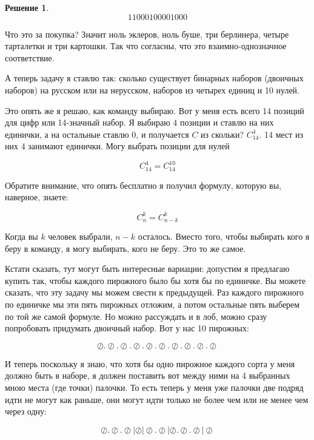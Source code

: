 \documentclass[russian]{lecture-notes}
\theoremstyle{definition}
\newtheorem*{solution}{Решение}
\begin{document}
\begin{enumerate}
\begin{solution}
			\[
				1 1 0 0 0 1 0 0 0 0 1 0 0 0
			\]
			
			Что это за покупка? Значит ноль эклеров, ноль буше, три берлинера, четыре тарталетки и три картошки. Так что согласны, что это взаимно-однозначное соответствие.
			
			
			А теперь задачу я ставлю так: сколько существует бинарных наборов (двоичных наборов) на русском или на нерусском, наборов из четырех единиц и 10 нулей.
			
			Это опять же я решаю, как команду выбираю. Вот у меня есть всего 14 позиций для цифр или 14-значный набор. Я выбираю 4 позиции и ставлю на них единички, а на остальные ставлю 0, и получается $C$ из скольки? $C_{14}^4$. 14 мест из них 4 занимают единички. Могу выбрать позиции для нулей
			
			\[
				C_{14}^4 = C_{14}^{10}
			\]
			
		\end{solution}
	
		Обратите внимание, что опять бесплатно я получил формулу, которую вы, наверное, знаете:
		
		\[
		C_n^k = C_{n-k}^k
		\]
		
		Когда вы $k$ человек выбрали, $n - k$ осталось. Вместо того, чтобы выбирать кого я беру в команду, я могу выбирать, кого не беру. Это то же самое.
		
		Кстати сказать, тут могут быть интересные вариации: допустим я предлагаю купить так, чтобы каждого пирожного было бы хотя бы по единичке. Вы можете сказать, что эту задачу мы можем свести к предыдущей. Раз каждого пирожного по единичке мы эти пять пирожных отложим, а потом остальные пять выберем по той же самой формуле. Но можно рассуждать и в лоб, можно сразу попробовать придумать двоичный набор. Вот у нас 10 пирожных:
		
		\[
			\oslash . \oslash . \oslash . \oslash . \oslash . \oslash . \oslash . \oslash . \oslash . \oslash
		\]
		
		И теперь поскольку я знаю, что хотя бы одно пирожное каждого сорта у меня должно быть в наборе, я должен поставить вот между ними на 4 выбранных мною места (где точки) палочки. То есть теперь у меня уже палочки две подряд идти не могут как раньше, они могут идти только не более чем или не менее чем через одну:
		
		\[
			\oslash . \oslash . \oslash | \oslash | \oslash . \oslash | \oslash . \oslash . \oslash | \oslash
		\]
		

\end{enumerate}
\end{document}
